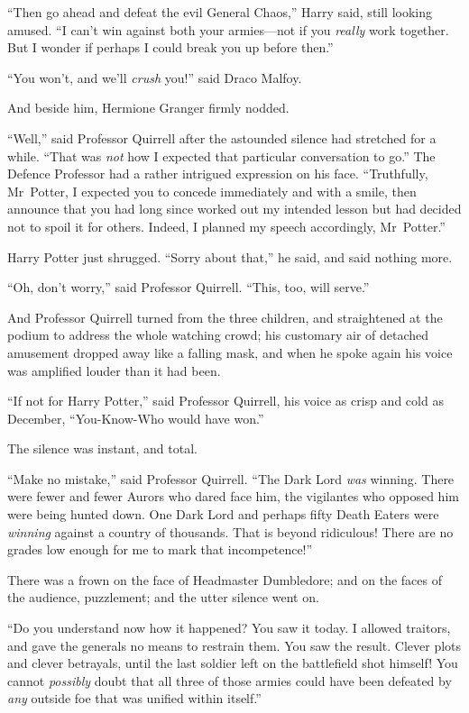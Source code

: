 “Then go ahead and defeat the evil General Chaos,” Harry said, still looking
amused. “I can’t win against both your armies—not if you \emph{really} work
together. But I wonder if perhaps I could break you up before then.”

“You won’t, and we’ll \emph{crush} you!” said Draco Malfoy.

And beside him, Hermione Granger firmly nodded.

“Well,” said Professor Quirrell after the astounded silence had stretched for a
while. “That was \emph{not} how I expected that particular conversation to go.”
The Defence Professor had a rather intrigued expression on his face.
“Truthfully, Mr~Potter, I expected you to concede immediately and with a
smile, then announce that you had long since worked out my intended lesson but
had decided not to spoil it for others. Indeed, I planned my speech
accordingly, Mr~Potter.”

Harry Potter just shrugged. “Sorry about that,” he said, and said nothing more.

“Oh, don’t worry,” said Professor Quirrell. “This, too, will serve.”

And Professor Quirrell turned from the three children, and straightened at the
podium to address the whole watching crowd; his customary air of detached
amusement dropped away like a falling mask, and when he spoke again his voice
was amplified louder than it had been.

“If not for Harry Potter,” said Professor Quirrell, his voice as crisp and cold
as December, “You-Know-Who would have won.”

The silence was instant, and total.

\later

“Make no mistake,” said Professor Quirrell. “The Dark Lord \emph{was} winning.
There were fewer and fewer Aurors who dared face him, the vigilantes who
opposed him were being hunted down. One Dark Lord and perhaps fifty Death
Eaters were \emph{winning} against a country of thousands. That is beyond
ridiculous! There are no grades low enough for me to mark that incompetence!”

There was a frown on the face of Headmaster Dumbledore; and on the faces of the
audience, puzzlement; and the utter silence went on.

“Do you understand now how it happened? You saw it today. I allowed traitors,
and gave the generals no means to restrain them. You saw the result. Clever
plots and clever betrayals, until the last soldier left on the battlefield shot
himself! You cannot \emph{possibly} doubt that all three of those armies could
have been defeated by \emph{any} outside foe that was unified within itself.”

